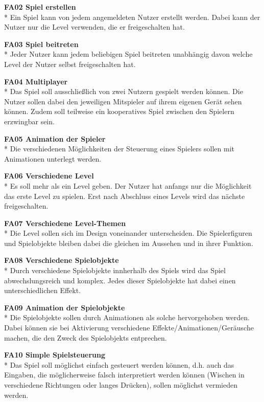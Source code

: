 \textbf{FA02 Spiel erstellen}\\*
Ein Spiel kann von jedem angemeldeten Nutzer erstellt werden. Dabei kann der Nutzer nur die Level verwenden, die er freigeschalten hat.

\textbf{FA03 Spiel beitreten}\\*
Jeder Nutzer kann jedem beliebigen Spiel beitreten unabhängig davon welche Level der Nutzer selbst freigeschalten hat.

\textbf{FA04 Multiplayer}\\*
Das Spiel soll ausschließlich von zwei Nutzern gespielt werden können. Die Nutzer sollen dabei den jeweiligen Mitspieler auf ihrem eigenen Gerät sehen können. Zudem soll teilweise ein kooperatives Spiel zwischen den Spielern erzwingbar sein.

\textbf{FA05 Animation der Spieler}\\*
Die verschiedenen Möglichkeiten der Steuerung eines Spielers sollen mit Animationen unterlegt werden. 

\textbf{FA06 Verschiedene Level}\\*
Es soll mehr als ein Level geben. Der Nutzer hat anfangs nur die Möglichkeit das erste Level zu spielen. Erst nach Abschluss eines Levels wird das nächste freigeschalten.

\textbf{FA07 Verschiedene Level-Themen}\\*
Die Level sollen sich im Design voneinander unterscheiden. Die Spielerfiguren und Spielobjekte bleiben dabei die gleichen im Aussehen und in ihrer Funktion.

\textbf{FA08 Verschiedene Spielobjekte}\\*
Durch verschiedene Spielobjekte innherhalb des Spiels wird das Spiel abwechslungsreich und komplex. Jedes dieser Spielobjekte hat dabei einen unterschiedlichen Effekt.

\textbf{FA09 Animation der Spielobjekte}\\*
Die Spielobjekte sollen durch Animationen als solche hervorgehoben werden. Dabei können sie bei Aktivierung verschiedene Effekte/Animationen/Geräusche machen, die den Zweck des Spielobjekts entprechen.

\textbf{FA10 Simple Spielsteuerung}\\*
Das Spiel soll möglichst einfach gesteuert werden können, d.h. auch das Eingaben, die möglicherweise falsch interpretiert werden können (Wischen in verschiedene Richtungen oder langes Drücken), sollen möglichst vermieden werden.


